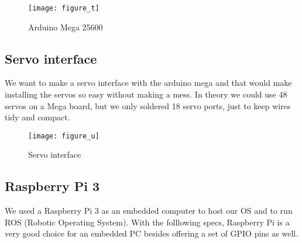 \begin{figure}[h]
	\centering
	\texttt{[image: figure\_t]}
	\caption{Arduino Mega 25600}
	\label{figure_t}
\end{figure}

\subsection{Servo interface}
We want to make a servo interface with the arduino mega and that would make installing the servos so easy without making a mess. In theory we could use 48 servos on a Mega board, but we only soldered 18 servo ports, just to keep wires tidy and compact.

\begin{figure}[h]
	\centering
	\texttt{[image: figure\_u]}
	\caption{Servo interface}
	\label{figure_u}
\end{figure}

\subsection{Raspberry Pi 3}
We used a Raspberry Pi 3 as an embedded computer to host our OS and to run ROS (Robotic Operating System). With the folllowing specs, Raspberry Pi is a very good choice for an embedded PC besides offering a set of GPIO pins as well.

